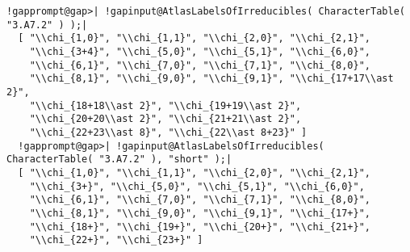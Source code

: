 \documentclass[a4paper,11pt]{report}
\begin{document}
{{{ 
\begin{Verbatim}[commandchars=!@|,fontsize=\small,frame=single,label=Example]
  !gapprompt@gap>| !gapinput@AtlasLabelsOfIrreducibles( CharacterTable( "3.A7.2" ) );|
  [ "\\chi_{1,0}", "\\chi_{1,1}", "\\chi_{2,0}", "\\chi_{2,1}", 
    "\\chi_{3+4}", "\\chi_{5,0}", "\\chi_{5,1}", "\\chi_{6,0}", 
    "\\chi_{6,1}", "\\chi_{7,0}", "\\chi_{7,1}", "\\chi_{8,0}", 
    "\\chi_{8,1}", "\\chi_{9,0}", "\\chi_{9,1}", "\\chi_{17+17\\ast 2}",
    "\\chi_{18+18\\ast 2}", "\\chi_{19+19\\ast 2}", 
    "\\chi_{20+20\\ast 2}", "\\chi_{21+21\\ast 2}", 
    "\\chi_{22+23\\ast 8}", "\\chi_{22\\ast 8+23}" ]
  !gapprompt@gap>| !gapinput@AtlasLabelsOfIrreducibles( CharacterTable( "3.A7.2" ), "short" );|
  [ "\\chi_{1,0}", "\\chi_{1,1}", "\\chi_{2,0}", "\\chi_{2,1}", 
    "\\chi_{3+}", "\\chi_{5,0}", "\\chi_{5,1}", "\\chi_{6,0}", 
    "\\chi_{6,1}", "\\chi_{7,0}", "\\chi_{7,1}", "\\chi_{8,0}", 
    "\\chi_{8,1}", "\\chi_{9,0}", "\\chi_{9,1}", "\\chi_{17+}", 
    "\\chi_{18+}", "\\chi_{19+}", "\\chi_{20+}", "\\chi_{21+}", 
    "\\chi_{22+}", "\\chi_{23+}" ]
\end{Verbatim}
 }

}}
\end{document}
